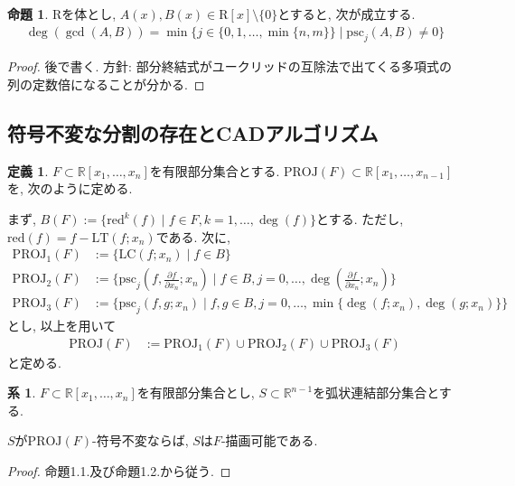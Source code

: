 \documentclass[dvipdfmx]{jsarticle}
\newcommand{\R}{\mathbb{R}}
\newcommand{\psc}{\mathrm{psc}}
\newcommand{\PROJ}{\mathrm{PROJ}}
\theoremstyle{definition}
\newtheorem{definition}{定義}[section]
\newtheorem{proposition}{命題}[section]
\newtheorem{corollary}{系}[section]
\begin{document}
\begin{proposition}
$\mathrm{R}$を体とし, $A(x), B(x) \in \mathrm{R}[x] \setminus \{0\}$とすると, 次が成立する.
\begin{align*}
\deg(\gcd(A, B)) = \min \{ j  \in \{0,1, \dots, \min\{n,m\}\}\mid \psc_j(A,B) \neq 0\}
\end{align*}
\end{proposition}

\begin{proof}
後で書く.
方針: 部分終結式がユークリッドの互除法で出てくる多項式の列の定数倍になることが分かる.


\end{proof}


\subsection{符号不変な分割の存在とCADアルゴリズム}
\begin{definition}
$F \subset \R[x_1, \dots, x_n]$を有限部分集合とする. $\PROJ(F) \subset \R[x_1, \dots, x_{n-1}]$を, 次のように定める.

まず,  $B(F) := \{ \mathrm{red}^k(f) \mid f \in F, k=1, \dots, \deg(f) \}$とする. ただし, $\mathrm{red}(f) = f - \mathrm{LT}(f; x_n)$である.
次に, 
\begin{align*}
	\PROJ_1(F) &:= \{\mathrm{LC}(f;x_n) \mid f \in B\}\\
	\PROJ_2(F) &:= \{\psc_j(f, \frac{\partial f}{\partial x_n}; x_n) \mid f \in B, j =0, \dots, \deg(\frac{\partial f}{\partial x_n};x_n) \}\\
	\PROJ_3(F) &:= \{\psc_j(f,g;x_n) \mid f,g \in B, j = 0, \dots, \min\{\deg(f;x_n), \deg(g;x_n)\}\}
\end{align*}
とし, 以上を用いて
\begin{align*}
	\PROJ(F) &:= \PROJ_1(F) \cup \PROJ_2(F) \cup \PROJ_3(F)
\end{align*}
と定める.
\end{definition}
\begin{corollary}
$F \subset \R[x_1, \dots, x_n]$を有限部分集合とし, $S \subset \R^{n-1}$を弧状連結部分集合とする.

$S$が$\PROJ(F)$-符号不変ならば, $S$は$F$-描画可能である.
\end{corollary}

\begin{proof}
命題1.1.及び命題1.2.から従う.
\end{proof}
\end{document}
